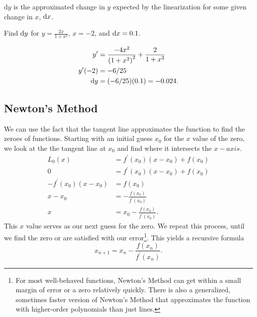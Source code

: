 $\mathrm{d}y$ is the approximated change in $y$ expected by the linearization for some given change in $x$, $\mathrm{d} x$.

\begin{example}
	Find $\mathrm{d} y$ for $y=\frac{2x}{1+x^2}$, $x=-2$, and $\mathrm{d} x = 0.1$.
\end{example}
\begin{answer}
	\begin{align*}
		y^\prime &= \frac{-4x^2}{\left(1+x^2\right)^2} + \frac{2}{1+x^2} \\
		y^\prime(-2) &= -6/25 \\
		\mathrm{d} y &= (-6/25)(0.1) = -0.024.
	\end{align*}
\end{answer}

\subsection{Newton's Method}
We can use the fact that the tangent line approximates the function to find the zeroes of functions.
Starting with an initial guess $x_0$ for the $x$ value of the zero, we look at the the tangent line at $x_0$ and find where it intersects the $x-axis$.
\begin{align*}
	L_0(x) &= f^\prime(x_0)(x - x_0) + f(x_0) \\
	0 &= f^\prime(x_0)(x - x_0) + f(x_0) \\
	-f^\prime(x_0)(x - x_0) &= f(x_0) \\
	x - x_0 &= -\frac{f(x_0)}{f^\prime(x_0)} \\
	x &= x_0 - \frac{f(x_0)}{f^\prime(x_0)}.
\end{align*}
This $x$ value serves as our next guess for the zero.
We repeat this process, until we find the zero or are satisfied with our error\footnote{For most well-behaved functions, Newton's Method can get within a small margin of error or a zero relatively quickly. There is also a generalized, sometimes faster version of Newton's Method that approximates the function with higher-order polynomials than just lines.}.
This yields a recursive formula
\begin{equation*}
	x_{n+1} = x_n - \frac{f(x_n)}{f^\prime(x_n)}.
\end{equation*}